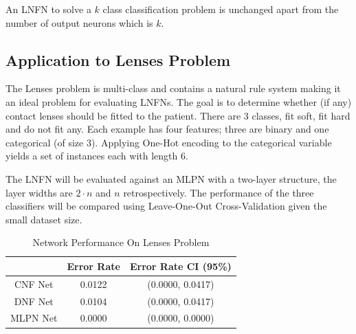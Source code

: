 \begin{definition}
	An LNFN to solve a $k$ class classification problem is unchanged apart from the number of output neurons which is $k$.
\end{definition}

\subsection{Application to Lenses Problem}
The Lenses problem \cite{Lichman:2013} is multi-class and contains a natural rule system making it an ideal problem for evaluating LNFNs. The goal is to determine whether (if any) contact lenses should be fitted to the patient. There are 3 classes, fit soft, fit hard and do not fit any. Each example has four features; three are binary and one categorical (of size 3). Applying One-Hot encoding to the categorical variable yields a set of instances each with length 6.


\noindent
\begin{minipage}[t]{0.35\textwidth}
	\vspace{0px}
	The LNFN will be evaluated against an MLPN with a two-layer structure, the layer widths are $2 \cdot n$ and $n$ retrospectively. The performance of the three classifiers will be compared using Leave-One-Out Cross-Validation given the small dataset size.\\
\end{minipage}
\hspace{0.05\textwidth}
\begin{minipage}[t]{0.6\textwidth}
	\vspace{0px}
	\begin{table}[H]
		\begin{center}
			\begin{tabular}{| c | c | c |}
				\hline
				& Error Rate & Error Rate CI (95\%) \\
				\hline
				\hline
				CNF Net & 0.0122 & (0.0000, 0.0417) \\
				\hline
				DNF Net & 0.0104 & (0.0000, 0.0417) \\
				\hline
				MLPN Net & 0.0000 & (0.0000, 0.0000) \\
				\hline
			\end{tabular}
		\end{center}
		\caption{Network Performance On Lenses Problem}
		\label{tab:lenses-peformance-comp}
	\end{table}
\end{minipage}

